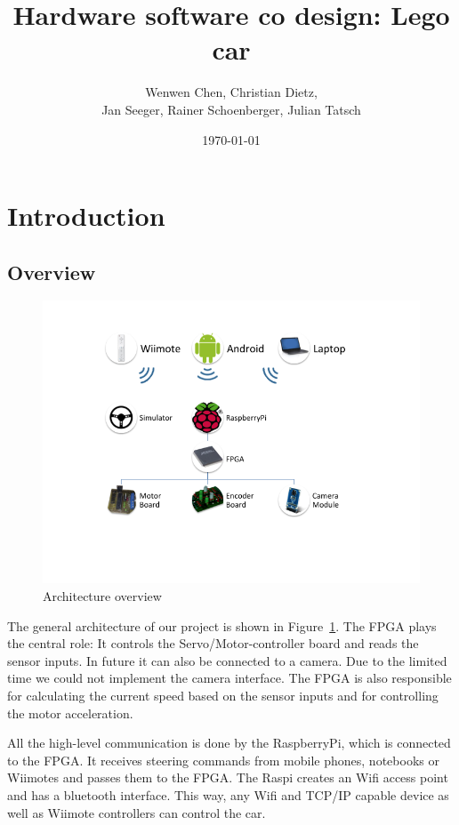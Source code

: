 \documentclass[a4paper
               ,10pt
               ,DIV=10 %
               ,BCOR=0.3cm
               ,pagesize %
               ,headings=small
               ,bibtotoc
               ]
               {scrartcl}
\title{Hardware software co design: Lego car}
\author{Wenwen Chen, Christian Dietz, \\
	Jan Seeger, Rainer Schoenberger, Julian Tatsch
}
\date{\today}
\begin{document}
\maketitle

\tableofcontents
\section{Introduction}
\subsection{Overview}

\begin{figure}[H]
\begin{center}
\includegraphics[width=\linewidth]{pic/architecture}
\caption{Architecture overview}
\label{figarchitecture}
\end{center}
\end{figure}

The general architecture of our project is shown in Figure~\ref{figarchitecture}.
The FPGA plays the central role:
It controls the Servo/Motor-controller board and reads the sensor inputs.
In future it can also be connected to a camera.
Due to the limited time we could not implement the camera interface.
The FPGA is also responsible for calculating the current speed based on the sensor inputs and for controlling the motor acceleration.

All the high-level communication is done by the RaspberryPi, which is connected to the FPGA.
It receives steering commands from mobile phones, notebooks or Wiimotes and passes them to the FPGA.
The Raspi creates an Wifi access point and has a bluetooth interface.
This way, any Wifi and TCP/IP capable device as well as Wiimote controllers can control the car.
\end{document}
